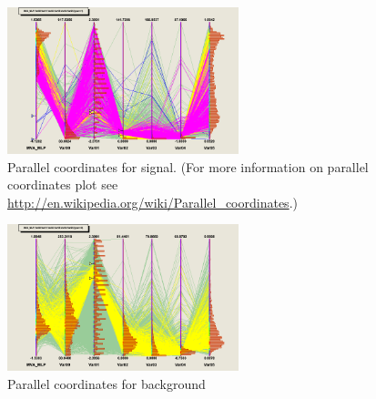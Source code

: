 \begin{figure}[!h]
\begin{center}
\includegraphics[width=0.6\textwidth]{images/ahParacoor_c0_S.png}
\caption{Parallel coordinates for signal. 
(For more information on parallel coordinates plot see \url{http://en.wikipedia.org/wiki/Parallel_coordinates}.)}
\label{fig:ahParacoor_c0_S}
\end{center}
\end{figure}
\begin{figure}[!h]
\begin{center}
\includegraphics[width=0.6\textwidth]{images/ahParacoor_c0_B.png}
\caption{Parallel coordinates for background}
\label{fig:ahParacoor_c0_B}
\end{center}
\end{figure}

\clearpage


